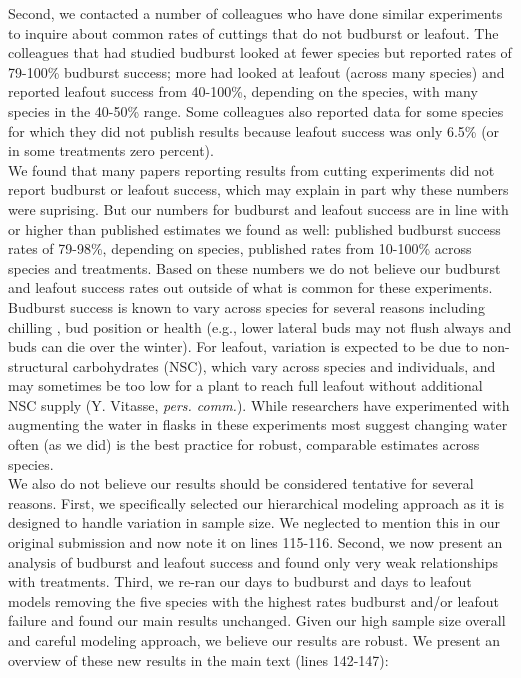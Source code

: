 \documentclass[11pt,a4paper]{article}
\begin{document}
Second, we contacted a number of colleagues who have done similar experiments \citep[colleagues contacted included authors on the following paper][]{Caffarra:2011aa,Basler:2012aa,Polgar:2014aa,vitasseclippings,zohner2016ncc} to inquire about common rates of cuttings that do not budburst or leafout. The colleagues that had studied budburst looked at fewer species but reported rates of 79-100\% budburst success; more had looked at leafout (across many species) and reported leafout success from 40-100\%, depending on the species, with many species in the 40-50\% range. Some colleagues also reported data for some species for which they did not publish results because leafout success was only 6.5\% (or in some treatments zero percent). \\

We found that many papers reporting results from cutting experiments did not report budburst or leafout success, which may explain in part why these numbers were suprising. But our numbers for budburst and leafout success are in line with or higher than published estimates we found as well: \citet{Basler:2012aa} published budburst success rates of 79-98\%, depending on species, \citet{laube2014gcb} published rates from 10-100\% across species and treatments. Based on these numbers we do not believe our budburst and leafout success rates out outside of what is common for these experiments.\\

Budburst success is known to vary across species for several reasons including chilling \citep{laube2014gcb}, bud position or health (e.g., lower lateral buds may not flush always and buds can die over the winter). For leafout, variation is expected to be due to non-structural carbohydrates (NSC), which vary across species and individuals, and may sometimes be too low for a plant to reach full leafout without additional NSC supply (Y. Vitasse, \emph{pers. comm.}). While researchers have experimented with augmenting the water in flasks in these experiments most suggest changing water often (as we did) is the best practice for robust, comparable estimates across species.\\

We also do not believe our results should be considered tentative for several reasons. First, we specifically selected our hierarchical modeling approach as it is designed to handle variation in sample size. We neglected to mention this in our original submission and now note it on lines 115-116. Second, we now present an analysis of budburst and leafout success and found only very weak relationships with treatments. Third, we re-ran our days to budburst and days to leafout models removing the five species with the highest rates budburst and/or leafout failure and found our main results unchanged. Given our high sample size overall and careful modeling approach, we believe our results are robust. We present an overview of these new results in the main text (lines 142-147):
\end{document}
